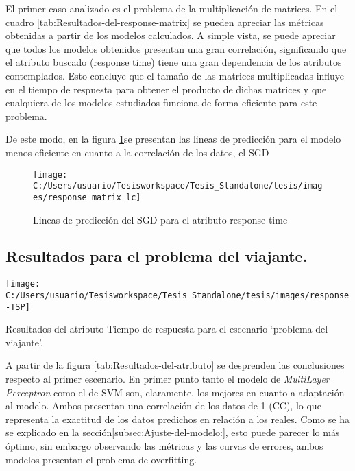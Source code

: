 El primer caso analizado es el problema de la multiplicación de matrices.
En el cuadro \ref{tab:Resultados-del-response-matrix} se pueden apreciar
las métricas obtenidas a partir de los modelos calculados. A simple
vista, se puede apreciar que todos los modelos obtenidos presentan
una gran correlación, significando que el atributo buscado (response
time) tiene una gran dependencia de los atributos contemplados. Esto
concluye que el tamaño de las matrices multiplicadas influye en el
tiempo de respuesta para obtener el producto de dichas matrices y
que cualquiera de los modelos estudiados funciona de forma eficiente
para este problema.

De este modo, en la figura \ref{fig:lineas-matrix-response}se presentan
las lineas de predicción para el modelo menos eficiente en cuanto
a la correlación de los datos, el \ac{SGD}

\begin{figure}
\texttt{[image: C:/Users/usuario/Tesisworkspace/Tesis\_Standalone/tesis/images/response\_matrix\_lc]}

\caption{Lineas de predicción del SGD para el atributo response time\label{fig:lineas-matrix-response}}


%
%
\end{figure}



\subsection{Resultados para el problema del viajante.\label{subsec:Resultados-para-el}}

\begin{table}[H]
\begin{centering}
\texttt{[image: C:/Users/usuario/Tesisworkspace/Tesis\_Standalone/tesis/images/response-TSP]}
\par\end{centering}

\caption{Resultados del atributo Tiempo de respuesta para el escenario ‘problema
del viajante’.\label{tab:Resultados-del-atributo}}
\end{table}


A partir de la figura \ref{tab:Resultados-del-atributo} se desprenden
las conclusiones respecto al primer escenario. En primer punto tanto
el modelo de \emph{MultiLayer Perceptron} como el de \ac{SVM} son,
claramente, los mejores en cuanto a adaptación al modelo. Ambos presentan
una correlación de los datos de 1 (\ac{CC}), lo que representa la
exactitud de los datos predichos en relación a los reales. Como se
ha se explicado en la sección\ref{subsec:Ajuste-del-modelo:}, esto
puede parecer lo más óptimo, sin embargo observando las métricas y
las curvas de errores, ambos modelos presentan el problema de overfitting. 

